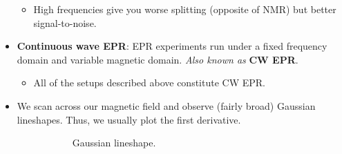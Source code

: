 \documentclass[../notes.tex]{subfiles}
\begin{document}
\begin{itemize}
\begin{itemize}
        \item High frequencies give you worse splitting (opposite of NMR) but better signal-to-noise.
    \end{itemize}
    \item \textbf{Continuous wave EPR}: EPR experiments run under a fixed frequency domain and variable magnetic domain. \emph{Also known as} \textbf{CW EPR}.
    \begin{itemize}
        \item All of the setups described above constitute CW EPR.
    \end{itemize}
    \item We scan across our magnetic field and observe (fairly broad) Gaussian lineshapes. Thus, we usually plot the first derivative.
    \begin{figure}[h!]
        \centering
        \begin{subfigure}[b]{0.45\linewidth}
            \centering
            \caption{Gaussian lineshape.}
            \label{fig:EPR1stDeriva}
        \end{subfigure}
        \begin{subfigure}[b]{0.45\linewidth}
            \centering
\end{subfigure}
\end{figure}
\end{itemize}
\end{document}
